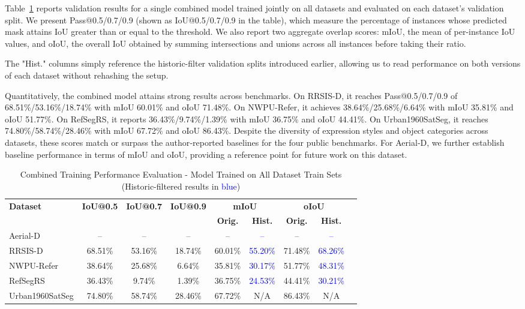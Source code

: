 Table~\ref{tab:combined_training_results} reports validation results for a single combined model trained jointly on all datasets and evaluated on each dataset's validation split. We present Pass@0.5/0.7/0.9 (shown as IoU@0.5/0.7/0.9 in the table), which measure the percentage of instances whose predicted mask attains IoU greater than or equal to the threshold. We also report two aggregate overlap scores: mIoU, the mean of per-instance IoU values, and oIoU, the overall IoU obtained by summing intersections and unions across all instances before taking their ratio.

The "Hist." columns simply reference the historic-filter validation splits introduced earlier, allowing us to read performance on both versions of each dataset without rehashing the setup.

Quantitatively, the combined model attains strong results across benchmarks. On RRSIS-D, it reaches Pass@0.5/0.7/0.9 of 68.51\%/53.16\%/18.74\% with mIoU 60.01\% and oIoU 71.48\%. On NWPU-Refer, it achieves 38.64\%/25.68\%/6.64\% with mIoU 35.81\% and oIoU 51.77\%. On RefSegRS, it reports 36.43\%/9.74\%/1.39\% with mIoU 36.75\% and oIoU 44.41\%. On Urban1960SatSeg, it reaches 74.80\%/58.74\%/28.46\% with mIoU 67.72\% and oIoU 86.43\%. Despite the diversity of expression styles and object categories across datasets, these scores match or surpass the author‑reported baselines for the four public benchmarks. For Aerial‑D, we further establish baseline performance in terms of mIoU and oIoU, providing a reference point for future work on this dataset.

\begin{table}[t]
\centering
\caption{Combined Training Performance Evaluation - Model Trained on All Dataset Train Sets (Historic-filtered results in \textcolor{blue}{blue})}
\label{tab:combined_training_results}
\begin{tabular}{@{}lcccccccc@{}}
\toprule
\textbf{Dataset} & \textbf{IoU@0.5} & \textbf{IoU@0.7} & \textbf{IoU@0.9} & \multicolumn{2}{c}{\textbf{mIoU}} & \multicolumn{2}{c}{\textbf{oIoU}} \\
\cmidrule(lr){5-6} \cmidrule(lr){7-8}
 & & & & \textbf{Orig.} & \textbf{Hist.} & \textbf{Orig.} & \textbf{Hist.} \\
\midrule
Aerial-D & -- & -- & -- & -- & \textcolor{blue}{--} & -- & \textcolor{blue}{--} \\
RRSIS-D & 68.51\% & 53.16\% & 18.74\% & 60.01\% & \textcolor{blue}{55.20\%} & 71.48\% & \textcolor{blue}{68.26\%} \\
NWPU-Refer & 38.64\% & 25.68\% & 6.64\% & 35.81\% & \textcolor{blue}{30.17\%} & 51.77\% & \textcolor{blue}{48.31\%} \\
RefSegRS & 36.43\% & 9.74\% & 1.39\% & 36.75\% & \textcolor{blue}{24.53\%} & 44.41\% & \textcolor{blue}{30.21\%} \\
Urban1960SatSeg & 74.80\% & 58.74\% & 28.46\% & 67.72\% & N/A & 86.43\% & N/A \\
\bottomrule
\end{tabular}
\end{table}


